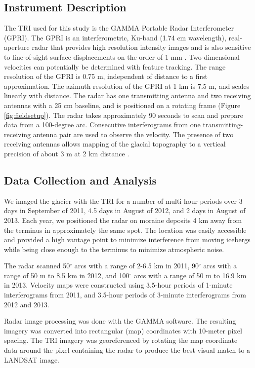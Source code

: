 \documentclass[review]{igs}
\begin{document}
\subsection{Instrument Description}
The TRI used for this study is the GAMMA Portable Radar Interferometer (GPRI). The GPRI is an interferometric, Ku-band (1.74 cm wavelength), real-aperture radar that provides high resolution intensity images and is also sensitive to line-of-sight surface displacements on the order of 1 mm \citep{werner2008real}. Two-dimensional velocities can potentially be determined with feature tracking. 
The range resolution of the GPRI is 0.75 m, independent of distance to a first approximation. The azimuth resolution of the GPRI at 1 km is 7.5 m, and scales linearly with distance. The radar has one transmitting antenna and two receiving antennas with a 25 cm baseline, and is positioned on a rotating frame (Figure \ref{fig:fieldsetup}). The radar takes approximately 90 seconds to scan and prepare data from a 100-degree arc. Consecutive interferograms from one transmitting-receiving antenna pair are used to observe the 
velocity. The presence of two receiving antennas allows mapping of the glacial topography to a 
vertical precision of about 3 m at 2 km distance \citep{strozzi2012topography}. 


\subsection{Data Collection and Analysis}
We imaged the glacier with the TRI for a number of multi-hour periods over 3 days in September of 2011, 4.5 days in August of 2012, and 2 days in August of 2013. Each year, we positioned the radar on moraine deposits  4 km away from the terminus in approximately the same spot. The location was easily accessible and provided a high vantage point to minimize interference from moving icebergs while being close enough to the terminus to minimize atmospheric noise. 


The radar scanned 50$^{\circ}$ arcs with a range of 2-6.5 km in 2011, 90$^{\circ}$ arcs with a range of 50 m to 8.5 km in 2012, and 100$^{\circ}$ arcs with a range of 50 m to 16.9 km in 2013. Velocity maps were constructed using 3.5-hour periods of 1-minute interferograms from 2011, and 3.5-hour periods of 3-minute interferograms from 2012 and 2013.


Radar image processing was done with the GAMMA software. The resulting imagery was converted into rectangular (map) coordinates with 10-meter pixel spacing. 
The TRI imagery was georeferenced by rotating the map coordinate data around the pixel containing the radar to produce the best visual match to a LANDSAT image.
\end{document}
